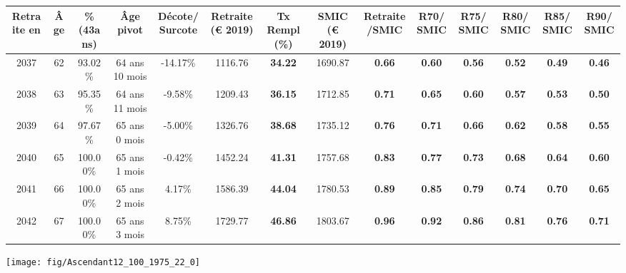 \begin{adjustbox}{max width=\textwidth} 
\begin{tabular}[htb]{|c|c||c|c|c||c|c||c|c||c|c|c|c|c|} 
\hline 
 Retraite en &  Âge &  \%(43ans) &  Âge pivot &  Décote/Surcote &  Retraite (\euro{} 2019) &  Tx Rempl(\%) &  SMIC (\euro{} 2019) &  Retraite/SMIC &  R70/SMIC &  R75/SMIC &  R80/SMIC &  R85/SMIC &  R90/SMIC \\ 
\hline \hline 
 2037 &  62 &  93.02\% &  64 ans 10 mois &  -14.17\% &  1116.76 &  {\bf 34.22} &  1690.87 &  {\bf {\color{red} 0.66}} &  {\bf {\color{red} 0.60}} &  {\bf {\color{red} 0.56}} &  {\bf {\color{red} 0.52}} &  {\bf {\color{red} 0.49}} &  {\bf {\color{red} 0.46}} \\ 
\hline 
 2038 &  63 &  95.35\% &  64 ans 11 mois &  -9.58\% &  1209.43 &  {\bf 36.15} &  1712.85 &  {\bf {\color{red} 0.71}} &  {\bf {\color{red} 0.65}} &  {\bf {\color{red} 0.60}} &  {\bf {\color{red} 0.57}} &  {\bf {\color{red} 0.53}} &  {\bf {\color{red} 0.50}} \\ 
\hline 
 2039 &  64 &  97.67\% &  65 ans 0 mois &  -5.00\% &  1326.76 &  {\bf 38.68} &  1735.12 &  {\bf {\color{red} 0.76}} &  {\bf {\color{red} 0.71}} &  {\bf {\color{red} 0.66}} &  {\bf {\color{red} 0.62}} &  {\bf {\color{red} 0.58}} &  {\bf {\color{red} 0.55}} \\ 
\hline 
 2040 &  65 &  100.00\% &  65 ans 1 mois &  -0.42\% &  1452.24 &  {\bf 41.31} &  1757.68 &  {\bf {\color{red} 0.83}} &  {\bf {\color{red} 0.77}} &  {\bf {\color{red} 0.73}} &  {\bf {\color{red} 0.68}} &  {\bf {\color{red} 0.64}} &  {\bf {\color{red} 0.60}} \\ 
\hline 
 2041 &  66 &  100.00\% &  65 ans 2 mois &  4.17\% &  1586.39 &  {\bf 44.04} &  1780.53 &  {\bf {\color{red} 0.89}} &  {\bf {\color{red} 0.85}} &  {\bf {\color{red} 0.79}} &  {\bf {\color{red} 0.74}} &  {\bf {\color{red} 0.70}} &  {\bf {\color{red} 0.65}} \\ 
\hline 
 2042 &  67 &  100.00\% &  65 ans 3 mois &  8.75\% &  1729.77 &  {\bf 46.86} &  1803.67 &  {\bf {\color{red} 0.96}} &  {\bf {\color{red} 0.92}} &  {\bf {\color{red} 0.86}} &  {\bf {\color{red} 0.81}} &  {\bf {\color{red} 0.76}} &  {\bf {\color{red} 0.71}} \\ 
\hline 
\hline 
\end{tabular} 
\end{adjustbox} 
 
 \vspace{0.1cm} 

 {\hspace{-2.2cm}\texttt{[image: fig/Ascendant12\_100\_1975\_22\_0]}} 

